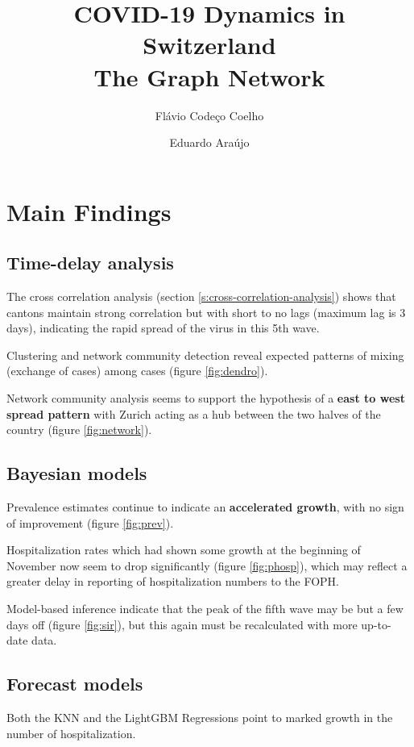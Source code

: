 \documentclass[11pt]{article}
\title{COVID-19 Dynamics in Switzerland \\ The Graph Network}
\author{Flávio Codeço Coelho \and Eduardo Araújo}
\begin{document}
    
    \maketitle
    
    
\tableofcontents

\listoffigures

\section{Main Findings}
\subsection{Time-delay analysis}
The cross correlation analysis (section \ref{s:cross-correlation-analysis}) shows that cantons maintain strong correlation but with short to no lags (maximum lag is 3 days), indicating the rapid spread of the virus in this 5th wave. 

Clustering and network community detection reveal expected patterns of mixing (exchange of cases) among cases (figure \ref{fig:dendro}).

Network community analysis seems to support the hypothesis of a \textbf{east to west spread pattern} with Zurich acting as a hub between the two halves of the country (figure \ref{fig:network}).

\subsection{Bayesian models}

Prevalence estimates continue to indicate an \textbf{accelerated growth}, with no sign of improvement (figure \ref{fig:prev}). 

Hospitalization rates which had shown some growth at the beginning of November now seem to drop significantly (figure \ref{fig:phosp}), which may reflect a greater delay in reporting of hospitalization numbers to the FOPH.

Model-based inference indicate that the peak of the fifth wave may be but a few days off (figure \ref{fig:sir}), but this again must be recalculated with more up-to-date data.

\subsection{Forecast models}
Both the KNN and the LightGBM Regressions point to marked growth in the number of hospitalization.
\end{document}
